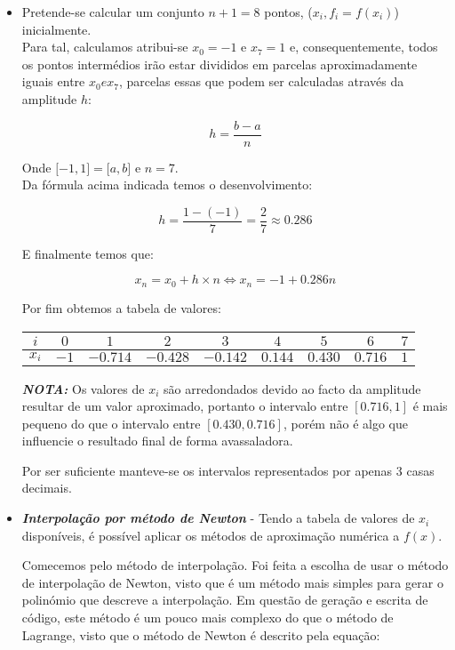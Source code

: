 \documentclass[12pt, letterpaper]{article}
\begin{document}
\begin{itemize}
    \item Pretende-se calcular um conjunto $n+1 = 8$ pontos, ($x_i, f_i = f(x_i)$) inicialmente. \\
    
    Para tal, calculamos atribui-se $x_0 = -1$ e $x_7 = 1$ e, consequentemente, todos os pontos intermédios irão estar divididos em parcelas aproximadamente iguais entre $x_0 e x_7$, parcelas essas que podem ser calculadas através da amplitude $h$:

    \[h = \frac{b-a}{n}\]

    Onde $\mathopen[-1,1\mathclose] = \mathopen[a,b\mathclose]$ e $n = 7$. \\
    
    Da fórmula acima indicada temos o desenvolvimento:

    \[h = \frac{1-(-1)}{7} = \frac{2}{7} \approx 0.286\]

    E finalmente temos que:

    \[x_n = x_0 + h\times n \Leftrightarrow x_n = -1 + 0.286n\]

    Por fim obtemos a tabela de valores:
    
    \begin{center}
        \begin{tabular} {|| c | c | c | c | c | c | c | c | c ||} \hline
            $i$ & $0$ & $1$ & $2$ & $3$ & $4$ & $5$ & $6$ & $7$\\ [0.4ex]\hline
            $x_i$ & $-1$ & $-0.714$ & $-0.428$ & $-0.142$ & $0.144$ & $0.430$ & $0.716$ & $1$ \\ [0.4ex]\hline
        \end{tabular}
    \end{center}

    \textbf{\textit{NOTA:}} Os valores de $x_i$ são arredondados devido ao facto da amplitude resultar de um valor aproximado, portanto o intervalo entre $[0.716,1]$ é mais pequeno do que o intervalo entre $[0.430, 0.716]$, porém não é algo que influencie o resultado final de forma avassaladora.

    Por ser suficiente manteve-se os intervalos representados por apenas 3 casas decimais.

    \item \textbf{\textit{Interpolação por método de Newton}} - Tendo a tabela de valores de $x_i$ disponíveis, é possível aplicar os métodos de aproximação numérica a $f(x)$.

    Comecemos pelo método de interpolação. Foi feita a escolha de usar o método de interpolação de Newton, visto que é um método mais simples para gerar o polinómio que descreve a interpolação. Em questão de geração e escrita de código, este método é um pouco mais complexo do que o método de Lagrange, visto que o método de Newton é descrito pela equação:


\end{itemize}
\end{document}
